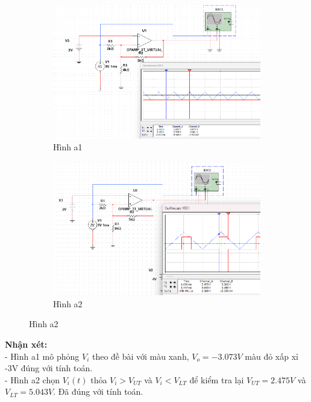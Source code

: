 \begin{figure}[H]
    \centering
    \begin{subfigure}[b]{0.48\textwidth}
        \centering
        \includegraphics[width=\textwidth]{image/C12_a.png}
        \caption*{Hình a1}
    \end{subfigure}
    \hfill
    \begin{subfigure}[b]{0.48\textwidth}
        \centering
        \includegraphics[width=\textwidth]{image/C12_a_1.png}
        \caption*{Hình a2}
    \end{subfigure}
\end{figure}

\textbf{Nhận xét:}\\
- Hình a1 mô phỏng $V_i$ theo đề bài với màu xanh, $V_o=-3.073V$ màu đỏ xấp xỉ -3V đúng với tính toán.\\
- Hình a2 chọn $V_i(t)$ thỏa $V_i>V_{UT}$ và $V_i<V_{LT}$ để kiểm tra lại $V_{UT}=2.475V$ và $V_{LT}=5.043V$. Đã đúng với tính toán.\\

